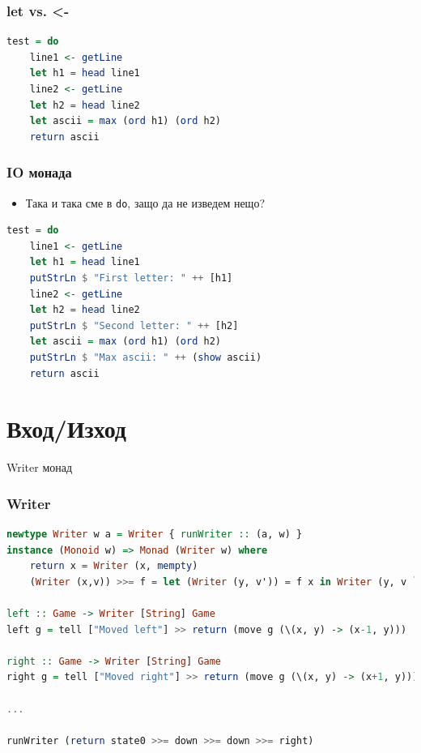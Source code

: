 \documentclass{beamer}
\begin{document}
\begin{frame}[fragile]
  \frametitle{let vs. <-}
\begin{lstlisting}[language=Haskell]
test = do
    line1 <- getLine
    let h1 = head line1
    line2 <- getLine
    let h2 = head line2
    let ascii = max (ord h1) (ord h2)
    return ascii
\end{lstlisting}
\end{frame}



\begin{frame}[fragile]
  \frametitle{IO монада}
\begin{itemize}
  \item Така и така сме в \verb#do#, защо да не изведем нещо?
\end{itemize}
\begin{lstlisting}[basicstyle=\small,language=Haskell]
test = do
    line1 <- getLine
    let h1 = head line1
    putStrLn $ "First letter: " ++ [h1]
    line2 <- getLine
    let h2 = head line2
    putStrLn $ "Second letter: " ++ [h2]
    let ascii = max (ord h1) (ord h2)
    putStrLn $ "Max ascii: " ++ (show ascii)
    return ascii
\end{lstlisting}
\end{frame}


\section{Вход/Изход}
\begin{frame}
  \centerline{Writer монад}
\end{frame}


\begin{frame}[fragile]
  \frametitle{Writer}
\begin{lstlisting}[basicstyle=\tiny,language=Haskell]
newtype Writer w a = Writer { runWriter :: (a, w) }
instance (Monoid w) => Monad (Writer w) where
    return x = Writer (x, mempty)
    (Writer (x,v)) >>= f = let (Writer (y, v')) = f x in Writer (y, v `mappend` v')

left :: Game -> Writer [String] Game
left g = tell ["Moved left"] >> return (move g (\(x, y) -> (x-1, y)))

right :: Game -> Writer [String] Game
right g = tell ["Moved right"] >> return (move g (\(x, y) -> (x+1, y)))

...

runWriter (return state0 >>= down >>= down >>= right)
\end{lstlisting}
\end{frame}




\end{document}
